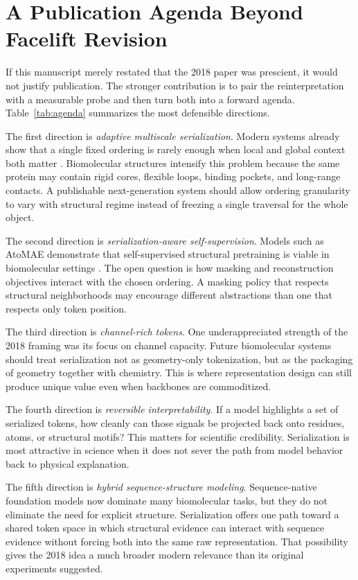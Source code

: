 \section{A Publication Agenda Beyond Facelift Revision}



If this manuscript merely restated that the 2018 paper was prescient, it would not justify publication. The stronger contribution is to pair the reinterpretation with a measurable probe and then turn both into a forward agenda. Table~\ref{tab:agenda} summarizes the most defensible directions.

The first direction is \emph{adaptive multiscale serialization}. Modern systems already show that a single fixed ordering is rarely enough when local and global context both matter \citep{li2025noksr}. Biomolecular structures intensify this problem because the same protein may contain rigid cores, flexible loops, binding pockets, and long-range contacts. A publishable next-generation system should allow ordering granularity to vary with structural regime instead of freezing a single traversal for the whole object.

The second direction is \emph{serialization-aware self-supervision}. Models such as AtoMAE demonstrate that self-supervised structural pretraining is viable in biomolecular settings \citep{park2025atomae}. The open question is how masking and reconstruction objectives interact with the chosen ordering. A masking policy that respects structural neighborhoods may encourage different abstractions than one that respects only token position.

The third direction is \emph{channel-rich tokens}. One underappreciated strength of the 2018 framing was its focus on channel capacity. Future biomolecular systems should treat serialization not as geometry-only tokenization, but as the packaging of geometry together with chemistry. This is where representation design can still produce unique value even when backbones are commoditized.

The fourth direction is \emph{reversible interpretability}. If a model highlights a set of serialized tokens, how cleanly can those signals be projected back onto residues, atoms, or structural motifs? This matters for scientific credibility. Serialization is most attractive in science when it does not sever the path from model behavior back to physical explanation.

The fifth direction is \emph{hybrid sequence-structure modeling}. Sequence-native foundation models now dominate many biomolecular tasks, but they do not eliminate the need for explicit structure. Serialization offers one path toward a shared token space in which structural evidence can interact with sequence evidence without forcing both into the same raw representation. That possibility gives the 2018 idea a much broader modern relevance than its original experiments suggested.

